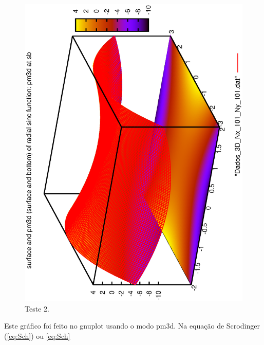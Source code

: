 \documentclass[10pt,a4paper,twocolumn,showkeys,showpacs,aps,groupedaddress,noeprint]{revtex4-1}
\begin{document}
\begin{figure}[!h]
\begin{center}
\includegraphics[width=0.70\linewidth,angle=-90]{Superficie.eps}
\end{center}
\caption{Teste 2. \protect\lipsum[3]}
\label{Resistor}
\end{figure}

Este gráfico foi feito no gnuplot usando
o modo pm3d. Na equação de Scrodinger (\ref{eq:Sch})
ou \eqref{eq:Sch}
\end{document}
